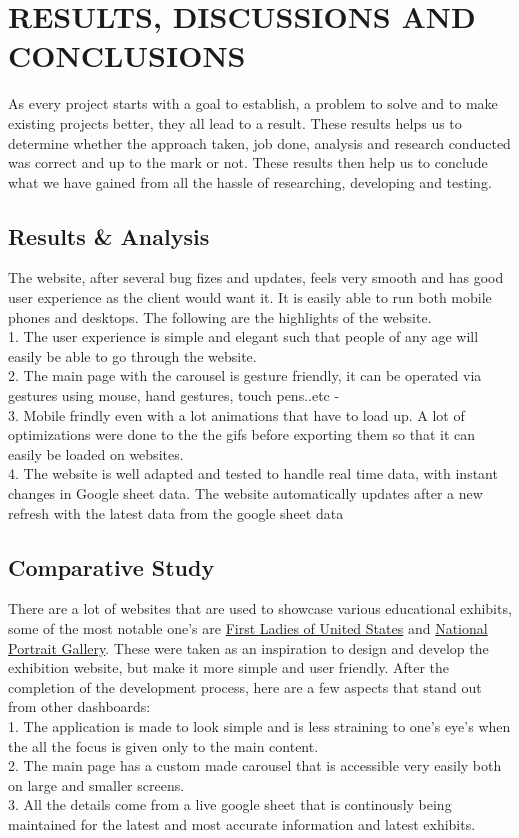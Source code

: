  \chapter{RESULTS, DISCUSSIONS AND CONCLUSIONS} %
\label{ChapterResults} %
As every project starts with a goal to establish, a problem to solve and to make existing
projects better, they all lead to a result. These results helps us to determine whether the
approach taken, job done, analysis and research conducted was correct and up to the
mark or not. These results then help us to conclude what we have gained from all the
hassle of researching, developing and testing.

\section{Results \& Analysis}
The website, after several bug fizes and updates, feels very smooth and has good user experience as the client would want it. It is easily able to run both mobile phones and desktops. The following are the highlights of the website.
\\
1. The user experience is simple and elegant such that people of any age will easily be able to go through the website. 
\\
2. The main page with the carousel is gesture friendly, it can be operated via gestures using mouse, hand gestures, touch pens..etc   -
\\
3. Mobile frindly even with a lot animations that have to load up. A lot of optimizations were done to the the gifs before exporting them so that it can easily be loaded on websites.
\\
4. The website is well adapted and tested to handle real time data, with instant changes in Google sheet data. The website automatically updates after a new refresh with the latest data from the google sheet data


\section{Comparative Study}
There are a lot of websites that are used to showcase various educational exhibits, some of the most notable one's are \href{https://firstladies.si.edu/gallery}{First Ladies of United States} and \href{https://www.npg.si.edu/}{National Portrait Gallery}. These were taken as an inspiration to design and develop the exhibition website, but make it more simple and user friendly. After the completion of the development process, here are a few
aspects that stand out from other dashboards:
\\
1. The application is made to look simple and is less straining to one's eye's when the all the focus is given only to the main content.
\\
2. The main page has a custom made carousel that is accessible very easily both on large and smaller screens.
\\
3. All the details come from a live google sheet that is continously being maintained for the latest and most accurate information and latest exhibits.


